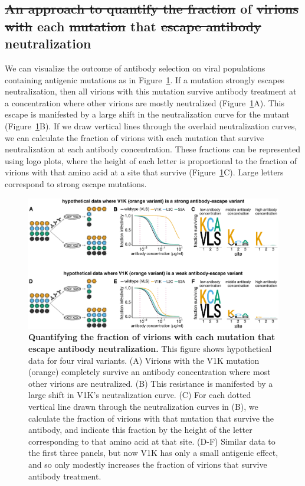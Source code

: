 \documentclass[11pt]{article}
\providecommand{\DIFaddtex}[1]{{\protect\color{blue}\uwave{#1}}} %
\providecommand{\DIFdeltex}[1]{{\protect\color{red}\sout{#1}}}                      %
\providecommand{\DIFaddbegin}{} %
\providecommand{\DIFaddend}{} %
\providecommand{\DIFdelbegin}{} %
\providecommand{\DIFdelend}{} %
\providecommand{\DIFadd}[1]{\texorpdfstring{\DIFaddtex{#1}}{#1}} %
\providecommand{\DIFdel}[1]{\texorpdfstring{\DIFdeltex{#1}}{}} %
\begin{document}
\subsection*{\DIFdelbegin \DIFdel{An approach to quantify the fraction }\DIFdelend \DIFaddbegin \DIFadd{Fraction }\DIFaddend of \DIFdelbegin \DIFdel{virions with }\DIFdelend each \DIFdelbegin \DIFdel{mutation }\DIFdelend \DIFaddbegin \DIFadd{viral mutant }\DIFaddend that \DIFdelbegin \DIFdel{escape antibody }\DIFdelend \DIFaddbegin \DIFadd{escapes }\DIFaddend neutralization}
We can visualize the outcome of antibody selection on viral populations containing antigenic mutations as in Figure~\ref{fig:fracsurvive_example}.
If a mutation strongly escapes neutralization, then all virions with this mutation survive antibody treatment at a concentration where other virions are mostly neutralized (Figure~\ref{fig:fracsurvive_example}A).
This escape is manifested by a large shift in the neutralization curve for the mutant (Figure~\ref{fig:fracsurvive_example}B).
If we draw vertical lines through the overlaid neutralization curves, we can calculate the fraction of virions with each mutation that survive neutralization at each antibody concentration.
These fractions can be represented using logo plots, where the height of each letter is proportional to the fraction of virions with that amino acid at a site that survive (Figure~\ref{fig:fracsurvive_example}C).
Large letters correspond to strong escape mutations. 

\begin{figure}
\centerline{\includegraphics[width=\textwidth]{figs/fracsurvive_example/fracsurvive_fig.pdf}}
\caption{\label{fig:fracsurvive_example}
{\bf Quantifying the fraction of virions with each mutation that escape antibody neutralization.}
This figure shows hypothetical data for four viral variants.
(A) Virions with the V1K mutation (orange) completely survive an antibody concentration where most other virions are neutralized.
(B) This resistance is manifested by a large shift in V1K's neutralization curve.
(C) For each dotted vertical line drawn through the neutralization curves in (B), we calculate the fraction of virions with that mutation that survive the antibody, and indicate this fraction by the height of the letter corresponding to that amino acid at that site.
(D-F) Similar data to the first three panels, but now V1K has only a small antigenic effect, and so only modestly increases the fraction of virions that survive antibody treatment.
}
\end{figure}
\end{document}

